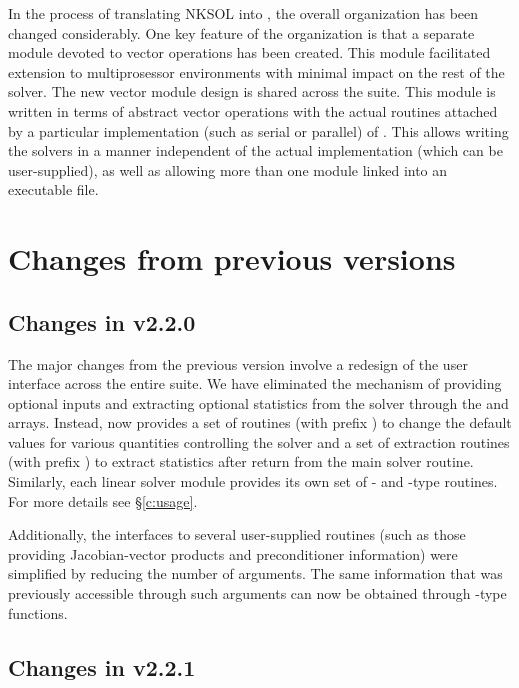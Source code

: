 In the process of translating NKSOL into {\C}, the overall
{\kinsol} organization has been changed considerably. One key
feature of the {\kinsol} organization is that a separate module
devoted to vector operations has been created.  This module
facilitated extension to multiprosessor environments with minimal
impact on the rest of the solver. The new vector module design is
shared across the {\sundials} suite. This {\nvector} module is
written in terms of abstract vector operations with the actual
routines attached by a particular implementation (such as serial
or parallel) of {\nvector}. This allows writing the {\sundials}
solvers in a manner independent of the actual {\nvector}
implementation (which can be user-supplied), as well as allowing
more than one {\nvector} module linked into an executable file.

\section{Changes from previous versions}

\subsection*{Changes in v2.2.0}

The major changes from the previous version involve a redesign of
the user interface across the entire {\sundials} suite. We have
eliminated the mechanism of providing optional inputs and
extracting optional statistics from the solver through the
 and  arrays. Instead, {\kinsol} now provides a
set of routines (with prefix ) to change the default
values for various quantities controlling the solver and a set of
extraction routines (with prefix ) to extract
statistics after return from the main solver routine. Similarly,
each linear solver module provides its own set of {-} and
{-type} routines. For more details see \S\ref{c:usage}.

Additionally, the interfaces to several user-supplied routines
(such as those providing Jacobian-vector products and
preconditioner information) were simplified by reducing the number
of arguments. The same information that was previously accessible
through such arguments can now be obtained through {-type}
functions.

\subsection*{Changes in v2.2.1}

